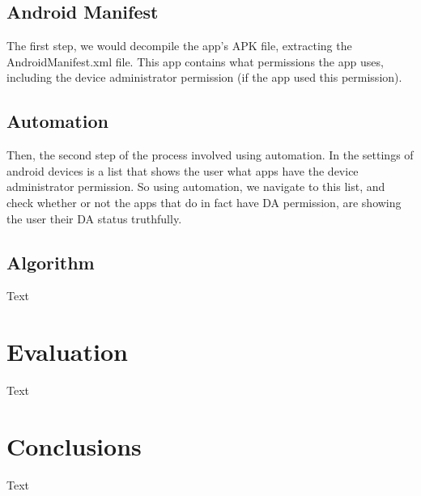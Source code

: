 \documentclass[10pt,twocolumn,letterpaper]{article}
\begin{document}
\subsection{Android Manifest}

The first step, we would decompile the app’s APK file, extracting the AndroidManifest.xml file. This app contains what permissions the app uses, including the device administrator permission (if the app used this permission).

\subsection{Automation}

Then, the second step of the process involved using automation. In the settings of android devices is a list that shows the user what apps have the device administrator permission. So using automation, we navigate to this list, and check whether or not the apps that do in fact have DA permission, are showing the user their DA status truthfully.


\subsection{Algorithm}

Text

\section{Evaluation}

Text



\section{Conclusions}

Text


{\small


}
\end{document}
